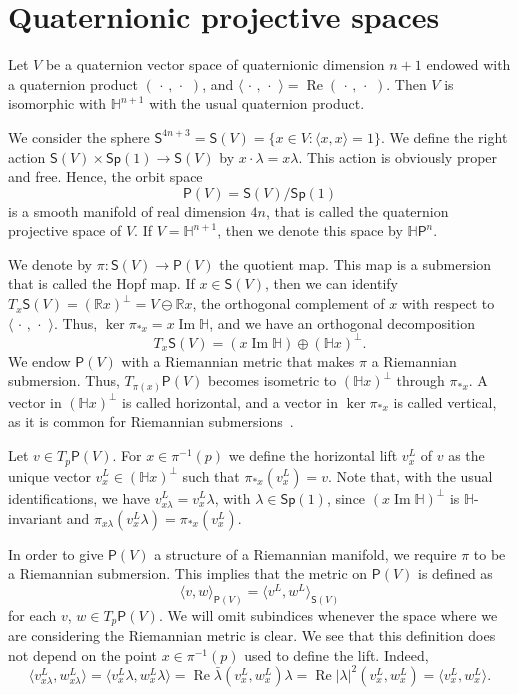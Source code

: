 \documentclass[12pt, a4paper]{amsart}
\newcommand{\R}{\mathbb{R}}
\renewcommand{\H}{\mathbb{H}}
\renewcommand{\Re}{\operatorname{Re}}
\renewcommand{\Im}{\operatorname{Im}}
\newcommand{\Sp}{\mathsf{Sp}}
\theoremstyle{remark}
\begin{document}
\section{Quaternionic projective spaces}

Let $V$ be a quaternion vector space of quaternionic dimension $n+1$ endowed with a quaternion product $(\,\cdot\,,\,\cdot\,\,)$, and $\langle\,\cdot\,,\,\cdot\,\,\rangle=\Re(\,\cdot\,,\,\cdot\,\,)$.
Then $V$ is isomorphic with $\H^{n+1}$ with the usual quaternion product.

We consider the sphere $\mathsf{S}^{4n+3}=\mathsf{S}(V)=\{{x}\in V:\langle {x},{x}\rangle=1\}$.
We define the right action $\mathsf{S}(V)\times\Sp(1)\to\mathsf{S}(V)$ by ${x}\cdot \lambda={x}\lambda$.
This action is obviously proper and free. 
Hence, the orbit space 
\[
\mathsf{P}(V)=\mathsf{S}(V)/\Sp(1)
\]
is a smooth manifold of real dimension $4n$, that is called the quaternion projective space of $V$.
If $V=\H^{n+1}$, then we denote this space by $\H \mathsf{P}^n$.

We denote by $\pi\colon\mathsf{S}(V)\to\mathsf{P}(V)$ the quotient map.
This map is a submersion that is called the Hopf map.
If ${x}\in\mathsf{S}(V)$, then we can identify $T_{x}\mathsf{S}(V)=(\R{x})^\perp=V\ominus\R{x}$, the orthogonal complement of ${x}$ with respect to $\langle\,\cdot\,,\,\cdot\,\,\rangle$.
Thus, $\ker\pi_{*{x}}={x}\Im\H$, and we have an orthogonal decomposition 
\[
T_{x}\mathsf{S}(V)=({x}\Im\H)\oplus(\H{x})^\perp.
\]
We endow $\mathsf{P}(V)$ with a Riemannian metric that makes $\pi$ a Riemannian submersion.
Thus, $T_{\pi({x})}\mathsf{P}(V)$ becomes isometric to $(\H{x})^\perp$ through $\pi_{*{x}}$.
A vector in $(\H x)^\perp$ is called horizontal, and a vector in $\ker\pi_{*x}$ is called vertical, as it is common for Riemannian submersions~\cite{ONeill}.

Let $v\in T_{p}\mathsf{P}(V)$.
For ${x}\in\pi^{-1}(p)$ we define the horizontal lift $v^L_{x}$ of $v$ as the unique vector $v_x^L\in(\H{x})^\perp$ such that $\pi_{*{x}}(v^L_{x})=v$.
Note that, with the usual identifications, we have $v_{x\lambda}^L=v_x^L\lambda$, with $\lambda\in\Sp(1)$, since $(x\Im\H)^\perp$ is $\H$-invariant and $\pi_{x\lambda}(v_x^L\lambda)=\pi_{*x}(v_x^L)$.
\medskip

In order to give $\mathsf{P}(V)$ a structure of a Riemannian manifold, we require $\pi$ to be a Riemannian submersion.
This implies that the metric on $\mathsf{P}(V)$ is defined as 
\[
\langle v,w\rangle_{\mathsf{P}(V)}=\langle v^L,w^L\rangle_{\mathsf{S}(V)}
\] 
for each $v$, $w\in T_p\mathsf{P}(V)$.
We will omit subindices whenever the space where we are considering the Riemannian metric is clear.
We see that this definition does not depend on the point ${x}\in\pi^{-1}(p)$ used to define the lift.
Indeed,
\[
\langle v^L_{{x}\lambda},w^L_{{x}\lambda}\rangle=
\langle v^L_{{x}}\lambda,w^L_{{x}}\lambda\rangle=
\Re\bar{\lambda}(v^L_{x},w^L_{x})\lambda=
\Re\lvert\lambda\rvert^2(v^L_{x},w^L_{x})=
\langle v^L_{x},w^L_{x}\rangle.
\]
\end{document}
